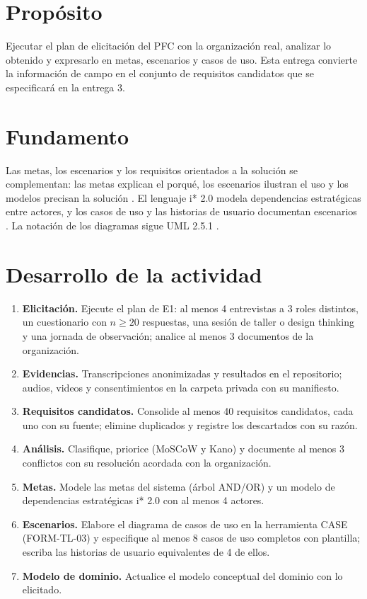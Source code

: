 \documentclass[11pt]{article}
\newcommand{\seccion}[1]{\section{\textcolor{utegreendk}{#1}}}
\begin{document}
\seccion{Propósito}

Ejecutar el plan de elicitación del PFC con la organización real, analizar lo obtenido y expresarlo en metas, escenarios y casos de uso. Esta entrega convierte la información de campo en el conjunto de requisitos candidatos que se especificará en la entrega 3.

\seccion{Fundamento}

Las metas, los escenarios y los requisitos orientados a la solución se complementan: las metas explican el porqué, los escenarios ilustran el uso y los modelos precisan la solución \citep{pohl_2025}. El lenguaje i* 2.0 modela dependencias estratégicas entre actores, y los casos de uso y las historias de usuario documentan escenarios \citep{pohl_2025,swebok_v4_2024}. La notación de los diagramas sigue UML 2.5.1 \citep{omg_uml_2017}.

\seccion{Desarrollo de la actividad}

\begin{enumerate}[leftmargin=20pt,itemsep=4pt]
	\item \textbf{Elicitación.} Ejecute el plan de E1: al menos 4 entrevistas a 3 roles distintos, un cuestionario con $n \geq 20$ respuestas, una sesión de taller o design thinking y una jornada de observación; analice al menos 3 documentos de la organización.
	\item \textbf{Evidencias.} Transcripciones anonimizadas y resultados en el repositorio; audios, videos y consentimientos en la carpeta privada con su manifiesto.
	\item \textbf{Requisitos candidatos.} Consolide al menos 40 requisitos candidatos, cada uno con su fuente; elimine duplicados y registre los descartados con su razón.
	\item \textbf{Análisis.} Clasifique, priorice (MoSCoW y Kano) y documente al menos 3 conflictos con su resolución acordada con la organización.
	\item \textbf{Metas.} Modele las metas del sistema (árbol AND/OR) y un modelo de dependencias estratégicas i* 2.0 con al menos 4 actores.
	\item \textbf{Escenarios.} Elabore el diagrama de casos de uso en la herramienta CASE (FORM-TL-03) y especifique al menos 8 casos de uso completos con plantilla; escriba las historias de usuario equivalentes de 4 de ellos.
	\item \textbf{Modelo de dominio.} Actualice el modelo conceptual del dominio con lo elicitado.
\end{enumerate}
\end{document}
